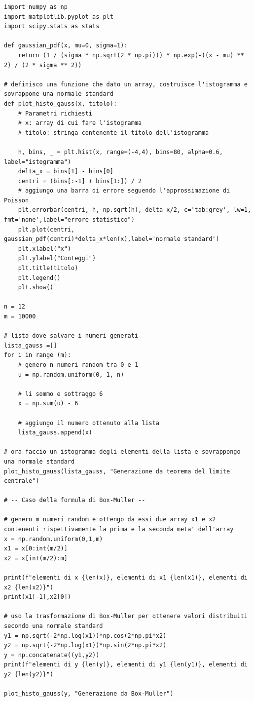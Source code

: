 \documentclass[openany,a4paper,12pt]{book}
\theoremstyle{remark}
\begin{document}
\begin{lstlisting}[caption={Generazione numeri casuali: Teorema del Limite Centrale e Box-Muller}]
import numpy as np
import matplotlib.pyplot as plt
import scipy.stats as stats

def gaussian_pdf(x, mu=0, sigma=1):
    return (1 / (sigma * np.sqrt(2 * np.pi))) * np.exp(-((x - mu) ** 2) / (2 * sigma ** 2))

# definisco una funzione che dato un array, costruisce l'istogramma e sovrappone una normale standard
def plot_histo_gauss(x, titolo):
    # Parametri richiesti
    # x: array di cui fare l'istogramma
    # titolo: stringa contenente il titolo dell'istogramma

    h, bins, _ = plt.hist(x, range=(-4,4), bins=80, alpha=0.6, label="istogramma")
    delta_x = bins[1] - bins[0]
    centri = (bins[:-1] + bins[1:]) / 2
    # aggiungo una barra di errore seguendo l'approssimazione di Poisson
    plt.errorbar(centri, h, np.sqrt(h), delta_x/2, c='tab:grey', lw=1, fmt='none',label="errore statistico")
    plt.plot(centri, gaussian_pdf(centri)*delta_x*len(x),label='normale standard')
    plt.xlabel("x")
    plt.ylabel("Conteggi")
    plt.title(titolo)
    plt.legend()
    plt.show()

n = 12
m = 10000

# lista dove salvare i numeri generati
lista_gauss =[]
for i in range (m):
    # genero n numeri random tra 0 e 1
    u = np.random.uniform(0, 1, n)

    # li sommo e sottraggo 6
    x = np.sum(u) - 6

    # aggiungo il numero ottenuto alla lista
    lista_gauss.append(x)

# ora faccio un istogramma degli elementi della lista e sovrappongo una normale standard
plot_histo_gauss(lista_gauss, "Generazione da teorema del limite centrale")

# -- Caso della formula di Box-Muller --

# genero m numeri random e ottengo da essi due array x1 e x2 contenenti rispettivamente la prima e la seconda meta' dell'array
x = np.random.uniform(0,1,m)
x1 = x[0:int(m/2)]
x2 = x[int(m/2):m]

print(f"elementi di x {len(x)}, elementi di x1 {len(x1)}, elementi di x2 {len(x2)}")
print(x1[-1],x2[0])

# uso la trasformazione di Box-Muller per ottenere valori distribuiti secondo una normale standard
y1 = np.sqrt(-2*np.log(x1))*np.cos(2*np.pi*x2)
y2 = np.sqrt(-2*np.log(x1))*np.sin(2*np.pi*x2)
y = np.concatenate((y1,y2))
print(f"elementi di y {len(y)}, elementi di y1 {len(y1)}, elementi di y2 {len(y2)}")

plot_histo_gauss(y, "Generazione da Box-Muller")
\end{lstlisting}
\end{document}
